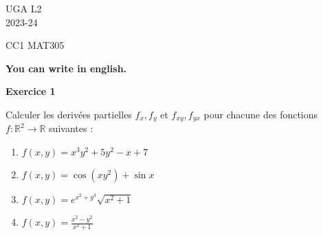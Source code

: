 \documentclass[a4paper,12pt]{article}
\begin{document}
	\noindent UGA \hfill L2\\
	\hfill 2023-24 \\
	\bigskip

	\begin{center}
		\textsc{CC1 MAT305}


{\bf You can write in english.}
		

	\end{center}
	\bigskip
	
\hrulefill
	
\vspace{1cm}

 

\begin{center}
{\large{\bf Exercice 1}}
\end{center}


Calculer les derivées partielles $f_x,f_y$ et $f_{xy}, f_{yx}$ pour
chacune des fonctions\\ 
$f:\mathbb{R}^2 \rightarrow \mathbb{R}$  suivantes :

 
 \begin{enumerate}
 
\item  $f(x,y) = x^3y^2+ 5y^2-x+7$

\item $ f(x,y) = \cos(xy^2)+\sin x$

\item $ f(x,y) = e^{x^2 + y^3}\sqrt{x^2+1}$

\item $f(x,y) = \frac{x^2 - y^2}{x^2 + 1}$

 \end{enumerate}


\end{document}
